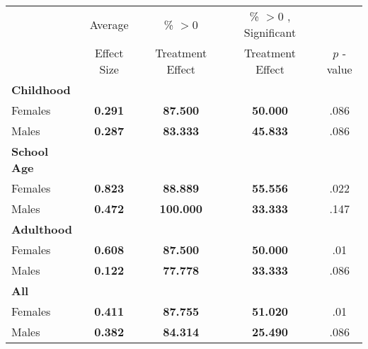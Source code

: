 \begin{tabular}{l c c c c}
\toprule
 & Average & \% $ >0 $ & \% $ >0 $ , Significant & \citet{Rosenbaum_2005_Distribution_JRSS} \\
 & Effect Size & Treatment Effect & Treatment Effect & $ p $ -value \\
\midrule
\textbf{Childhood} & & & & \\
\quad Females &  \textbf{    0.291} & \textbf{   87.500} & \textbf{   50.000} & .086 \\
\quad Males &  \textbf{    0.287} & \textbf{   83.333} & \textbf{   45.833} & .086 \\
\midrule
\textbf{School Age} & & & & \\
\quad Females &  \textbf{    0.823} & \textbf{   88.889} & \textbf{   55.556} & .022 \\
\quad Males &  \textbf{    0.472} & \textbf{  100.000} & \textbf{   33.333} & .147 \\
\midrule
\textbf{Adulthood} & & & & \\
\quad Females &  \textbf{    0.608} & \textbf{   87.500} & \textbf{   50.000} & .01 \\
\quad Males &  \textbf{    0.122} & \textbf{   77.778} & \textbf{   33.333} & .086 \\
\midrule
\textbf{All} & & & & \\
\quad Females &  \textbf{    0.411} & \textbf{   87.755} & \textbf{   51.020} & .01 \\
\quad Males &  \textbf{    0.382} & \textbf{   84.314} & \textbf{   25.490} & .086 \\
\midrule
\bottomrule
\end{tabular}

